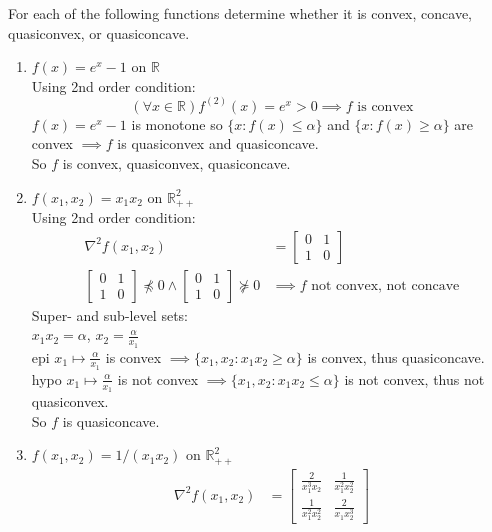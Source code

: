 \documentclass[12pt,letter]{article}
\newcommand{\R}{\mathbb{R}}
\newcommand{\set}[1]{\{#1\}}
\begin{document}
\begin{enumerate}
  For each of the following functions determine whether it is convex, concave, quasiconvex, or quasiconcave.\\
  \begin{enumerate}
  \item $f(x) = e^x - 1$ on $\R$\\
    Using 2nd order condition:
    \[(\forall x \in \R) f^{(2)}(x)=e^x > 0 \implies f \text{ is convex}\]
    $f(x)=e^x-1$ is monotone so $\set{x: f(x) \leq \alpha}$ and $\set{x: f(x) \geq \alpha}$ are convex $\implies f$ is quasiconvex and quasiconcave.\\
    So $f$ is convex, quasiconvex, quasiconcave.
  \item $f(x_1 , x_2 ) = x_1 x_2$ on $\R^2_{++}$\\
    Using 2nd order condition:
    \begin{align*}
      \nabla^2 f(x_1,x_2) &=
      \begin{bmatrix}
        0 & 1\\
        1 & 0
      \end{bmatrix}\\
      \begin{bmatrix}
        0 & 1\\
        1 & 0
      \end{bmatrix} \not \preceq 0 \wedge 
            \begin{bmatrix}
              0 & 1\\
              1 & 0
            \end{bmatrix} \not \succeq 0 & \implies f \text{ not convex, not concave}
    \end{align*}
    Super- and sub-level sets:\\
    $x_1x_2 = \alpha$, $x_2 = \frac{\alpha}{x_1}$\\
    epi $x_1 \mapsto \frac{\alpha}{x_1}$ is convex $\implies \set{ x_1,x_2: x_1x_2 \geq \alpha}$ is convex, thus quasiconcave.\\
    hypo $x_1 \mapsto \frac{\alpha}{x_1}$ is not convex $\implies \set{ x_1,x_2: x_1x_2 \leq \alpha}$ is not convex, thus not quasiconvex.\\
    So $f$ is quasiconcave.
  \item $f(x_1 , x_2 ) = 1/(x_1x_2)$ on $\R^2_{++}$
    \begin{align*}
      \nabla^2 f(x_1,x_2) &= \begin{bmatrix}
        \frac{2}{x_1^3 x_2} & \frac{1}{x_1^2 x_2^2}\\
        \frac{1}{x_1^2 x_2^2} & \frac{2}{x_1 x_2^3}

\end{bmatrix}
\end{align*}
\end{enumerate}
\end{enumerate}
\end{document}
